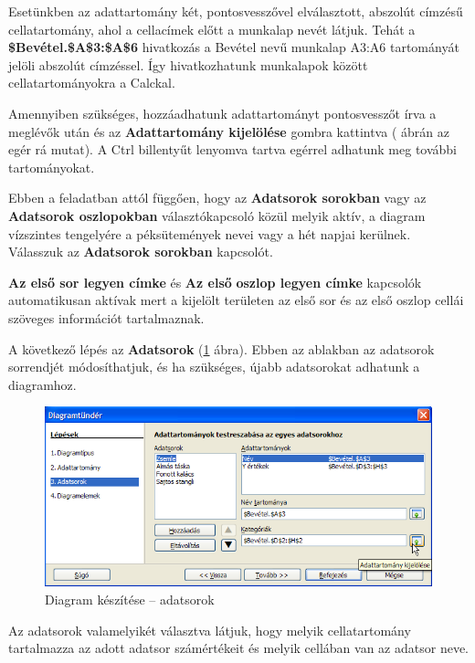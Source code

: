 Esetünkben az adattartomány két, pontosvesszővel
elválasztott, abszolút címzésű cellatartomány, ahol a
cellacímek előtt a munkalap nevét látjuk. Tehát a
\textbf{\$Bevétel.\$A\$3:\$A\$6} hivatkozás a Bevétel nevű
munkalap A3:A6 tartományát jelöli abszolút címzéssel. Így
hivatkozhatunk munkalapok között cellatartományokra a Calckal.

Amennyiben szükséges, hozzáadhatunk adattartományt
pontosvesszőt írva a meglévők után és az
\textbf{Adattartomány kijelölése} gombra kattintva (
ábrán az egér rá mutat). A Ctrl billentyűt lenyomva tartva
egérrel adhatunk meg további tartományokat. 

Ebben a feladatban attól függően, hogy az \textbf{Adatsorok
sorokban} vagy az \textbf{Adatsorok oszlopokban} választókapcsoló
közül melyik aktív, a diagram vízszintes tengelyére a
péksütemények nevei vagy a hét napjai kerülnek. Válasszuk
az \textbf{Adatsorok sorokban} kapcsolót.

\textbf{Az első sor legyen címke} és \textbf{Az
első}\textbf{ oszlop legyen címke} kapcsolók
automatikusan aktívak mert  a kijelölt területen az első sor
és az első oszlop cellái szöveges információt
tartalmaznak.

A következő lépés az \textbf{Adatsorok} (\ref{DiagramAdatsor} ábra).
Ebben az ablakban az adatsorok sorrendjét módosíthatjuk, és ha
szükséges, újabb adatsorokat adhatunk a diagramhoz.

\begin{figure}[!h]
\begin{center}
\includegraphics[width=15.499cm]{oocalcv1-img55.png}
\caption{Diagram készítése --  adatsorok}\label{DiagramAdatsor}
\end{center}
\end{figure}

Az adatsorok valamelyikét választva látjuk, hogy melyik
cellatartomány tartalmazza az adott adatsor számértékeit és
melyik cellában van az adatsor neve.


